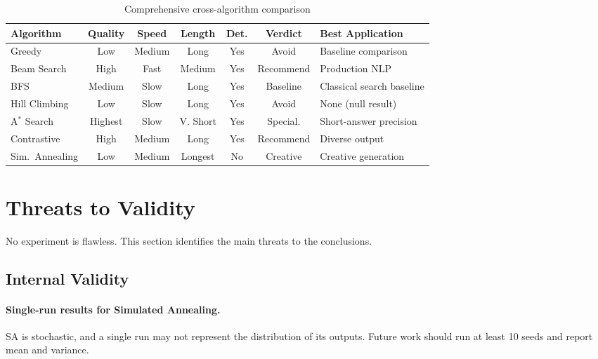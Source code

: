 \documentclass[12pt]{article}
\begin{document}
\begin{table}[H]
	\centering
	\caption{Comprehensive cross-algorithm comparison}
	\label{tab:comparison_boxed}
	\footnotesize
	\setlength{\tabcolsep}{3pt}
	\begin{tabularx}{\linewidth}{|X|c|c|c|c|c|X|}
		\hline
		\textbf{Algorithm} & \textbf{Quality} & \textbf{Speed} & \textbf{Length} & \textbf{Det.} & \textbf{Verdict} & \textbf{Best Application} \\ \hline
		Greedy          & Low    & Medium & Long    & Yes & Avoid    & Baseline comparison \\ \hline
		Beam Search     & High   & Fast   & Medium  & Yes & Recommend & Production NLP \\ \hline
		BFS             & Medium & Slow   & Long    & Yes & Baseline  & Classical search baseline \\ \hline
		Hill Climbing   & Low    & Slow   & Long    & Yes & Avoid    & None (null result) \\ \hline
		A$^*$ Search    & Highest& Slow   & V. Short& Yes & Special.  & Short-answer precision \\ \hline
		Contrastive     & High   & Medium & Long    & Yes & Recommend & Diverse output \\ \hline
		Sim.\ Annealing & Low    & Medium & Longest & No  & Creative  & Creative generation \\ \hline
	\end{tabularx}
\end{table}
	
	\section{Threats to Validity}
	\label{sec:threats}
	
	No experiment is flawless. This section identifies the main threats to the conclusions.
	
	\subsection{Internal Validity}
	
	\paragraph{Single-run results for Simulated Annealing.}
	SA is stochastic, and a single run may not represent the distribution of its outputs. Future work should run at least 10 seeds and report mean and variance.
	
\end{document}
